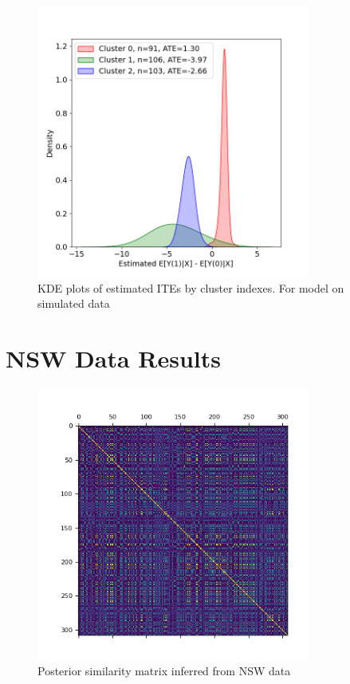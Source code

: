 \documentclass{article}
\begin{document}
\begin{figure}[H]
  \centering
  \includegraphics[width=0.8\textwidth]{Plots/Simulated_output_histogram.png}
  \caption{KDE plots of estimated ITEs by cluster indexes. For model on simulated data}
  \label{fig:sim_histo}
\end{figure}


\section{NSW Data Results}


\begin{figure}[H]
  \centering
  \includegraphics[width=0.8\textwidth]{Plots/NSW Posterior Similarity Matrix.png}
  \caption{Posterior similarity matrix inferred from NSW data}
  \label{fig:nsw_post_mat}
\end{figure}
\end{document}

